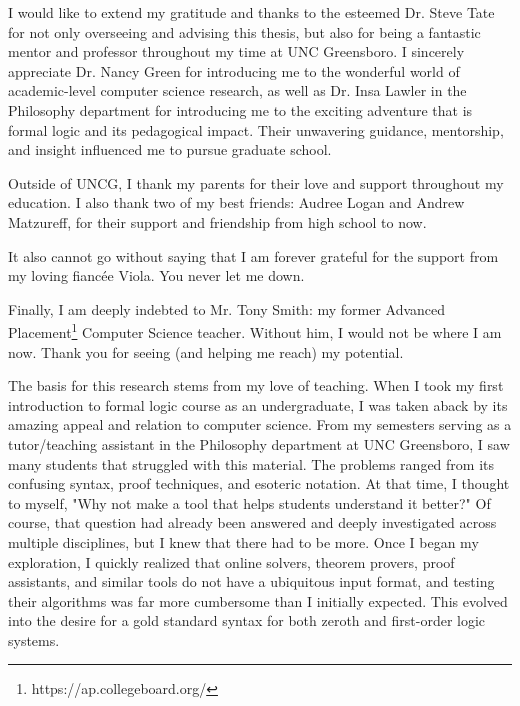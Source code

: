 \documentclass[ms]{uncgdissertationexp2}
\theoremstyle{plain}
\theoremstyle{definition}
\theoremstyle{remark}
\begin{document}
\begin{acknowledgments}
I would like to extend my gratitude and thanks to the esteemed Dr. Steve Tate for not only overseeing and advising this thesis, but also for being a fantastic mentor and professor throughout my time at UNC Greensboro. I sincerely appreciate Dr. Nancy Green for introducing me to the wonderful world of academic-level computer science research, as well as Dr. Insa Lawler in the Philosophy department for introducing me to the exciting adventure that is formal logic and its pedagogical impact. Their unwavering guidance, mentorship, and insight influenced me to pursue graduate school.

Outside of UNCG, I thank my parents for their love and support throughout my education. I also thank two of my best friends: Audree Logan and Andrew Matzureff, for their support and friendship from high school to now.

It also cannot go without saying that I am forever grateful for the support from my loving fiancée Viola. You never let me down.

Finally, I am deeply indebted to Mr. Tony Smith: my former Advanced Placement\footnote{https://ap.collegeboard.org/} Computer Science teacher. Without him, I would not be where I am now. Thank you for seeing (and helping me reach) my potential.
\end{acknowledgments}

\begin{preface}
The basis for this research stems from my love of teaching. When I took my first introduction to formal logic course as an undergraduate, I was taken aback by its amazing appeal and relation to computer science. From my semesters serving as a tutor/teaching assistant in the Philosophy department at UNC Greensboro, I saw many students that struggled with this material. The problems ranged from its confusing syntax, proof techniques, and esoteric notation. At that time, I thought to myself, "Why not make a tool that helps students understand it better?" Of course, that question had already been answered and deeply investigated across multiple disciplines, but I knew that there had to be more. Once I began my exploration, I quickly realized that online solvers, theorem provers, proof assistants, and similar tools do not have a ubiquitous input format, and testing their algorithms was far more cumbersome than I initially expected. This evolved into the desire for a gold standard syntax for both zeroth and first-order logic systems.
\end{preface}
\end{document}
